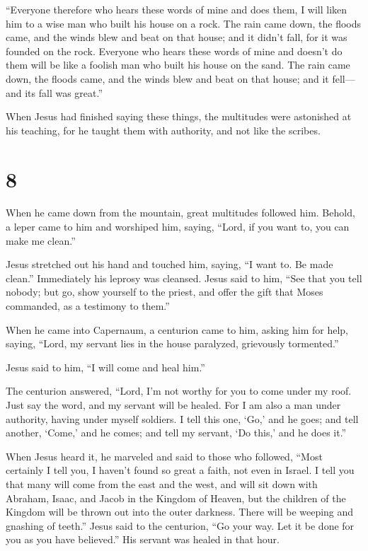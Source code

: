  ``Everyone therefore who hears these words of mine and
does them, I will liken him to a wise man who built his house on a rock.
 The rain came down, the floods came, and the winds blew
and beat on that house; and it didn't fall, for it was founded on the
rock.  Everyone who hears these words of mine and doesn't
do them will be like a foolish man who built his house on the sand.
 The rain came down, the floods came, and the winds blew
and beat on that house; and it fell---and its fall was great.''

 When Jesus had finished saying these things, the
multitudes were astonished at his teaching,  for he taught
them with authority, and not like the scribes.

\hypertarget{section-7}{%
\section{8}\label{section-7}}

 When he came down from the mountain, great multitudes
followed him.  Behold, a leper came to him and worshiped
him, saying, ``Lord, if you want to, you can make me clean.''

 Jesus stretched out his hand and touched him, saying, ``I
want to. Be made clean.'' Immediately his leprosy was cleansed.
 Jesus said to him, ``See that you tell nobody; but go, show
yourself to the priest, and offer the gift that Moses commanded, as a
testimony to them.''

 When he came into Capernaum, a centurion came to him,
asking him for help,  saying, ``Lord, my servant lies in the
house paralyzed, grievously tormented.''

 Jesus said to him, ``I will come and heal him.''

 The centurion answered, ``Lord, I'm not worthy for you to
come under my roof. Just say the word, and my servant will be healed.
 For I am also a man under authority, having under myself
soldiers. I tell this one, `Go,' and he goes; and tell another, `Come,'
and he comes; and tell my servant, `Do this,' and he does it.''

 When Jesus heard it, he marveled and said to those who
followed, ``Most certainly I tell you, I haven't found so great a faith,
not even in Israel.  I tell you that many will come from
the east and the west, and will sit down with Abraham, Isaac, and Jacob
in the Kingdom of Heaven,  but the children of the Kingdom
will be thrown out into the outer darkness. There will be weeping and
gnashing of teeth.''  Jesus said to the centurion, ``Go
your way. Let it be done for you as you have believed.'' His servant was
healed in that hour.

